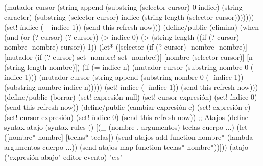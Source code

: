 \documentclass[letterpaper, twoside, openright, 11pt]{book}%
\begin{document}
{{              (mutador cursor
                       (string-append
                        (substring (selector cursor) 0 índice)
                        (string caracter)
                        (substring (selector cursor)
                                   índice
                                   (string-length (selector cursor)))))))
        (set! índice (+ índice 1))
        (send this refresh-now)))
    (define/public (elimina)
      (when (and (or (? cursor) (? cursor))
                 (> índice 0)
                 (> (string-length ((if (? cursor)
                                        -nombre
                                        -nombre)
                                    cursor))
                    1))
        (let* ([selector (if (? cursor)
                             -nombre
                             -nombre)]
               [mutador (if (? cursor)
                            set--nombre!
                            set--nombre!)]
               [nombre (selector cursor)]
               [n (string-length nombre)])
          (if (= índice n)
              (mutador cursor
                       (substring nombre 0 (- índice 1)))
              (mutador cursor
                       (string-append (substring nombre 0 (- índice 1))
                                      (substring nombre índice n)))))
        (set! índice (- índice 1))
        (send this refresh-now)))
    (define/public (borrar)
      (set! expresión null)
      (set! cursor expresión)
      (set! índice 0)
      (send this refresh-now))
    (define/public (cambiar-expresión e)
      (set! expresión e)
      (set! cursor expresión)
      (set! índice 0)
      (send this refresh-now))
    ;; Atajos
    (define-syntax atajo
      (syntax-rules ()
        [(_ (nombre . argumentos) teclas cuerpo ...)
         (let ([nombre* nombre]
               [teclas* teclas])
           (send atajos add-function nombre*
                 (lambda argumentos
                   cuerpo ...))
           (send atajos map-function teclas* nombre*))]))
    (atajo ("expresión-abajo" editor evento) "c:s"
}}
\end{document}
